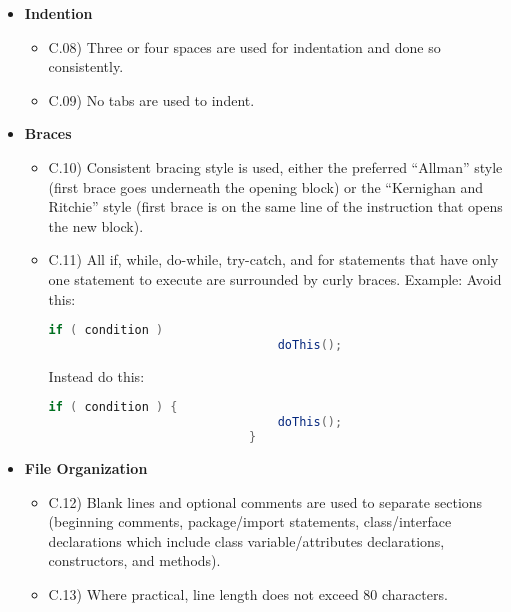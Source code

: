 \documentclass[../../codeInspection.tex]{subfiles}
\begin{document}
\begin{itemize}
\begin{itemize}
					  	\end{itemize}

				\item 	\textbf{Indention}
						\begin{itemize}

							\item C.08) Three or four spaces are used for indentation and done so consistently.

							\item C.09) No tabs are used to indent.

						\end{itemize}

				\item 	\textbf{Braces}
						\begin{itemize}

							\item C.10) Consistent bracing style is used, either the preferred “Allman” style (first brace goes underneath the opening block) or the “Kernighan and Ritchie” style (first brace is on the same line of the instruction that opens the new block).

							\item C.11) All if, while, do-while, try-catch, and for statements that have only one statement to execute are surrounded by curly braces. Example:
							Avoid this:
							\begin{lstlisting}[language=Java]
							if ( condition )
								doThis();
							\end{lstlisting}
							Instead do this:
							\begin{lstlisting}[language=Java]
							if ( condition ) {
								doThis(); 
							}
							\end{lstlisting}

						\end{itemize}

				\item 	\textbf{File Organization}
						\begin{itemize}

							\item C.12) Blank lines and optional comments are used to separate sections (beginning comments, package/import statements, class/interface declarations which include class variable/attributes declarations, constructors, and methods).

							\item C.13) Where practical, line length does not exceed 80 characters.


\end{itemize}
\end{itemize}
\end{document}
